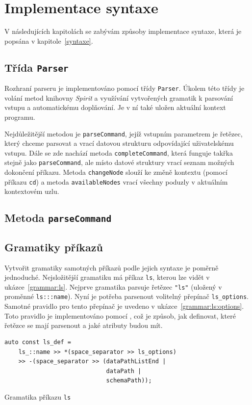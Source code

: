 \documentclass[thesis=B,czech,hidelinks]{FITthesis}[2019/03/06]
\begin{document}
\section{Implementace syntaxe}
V následujících kapitolách se zabývám způsoby implementace syntaxe, která je popsána v kapitole~\ref{syntaxe}.

\subsection{Třída \texttt{Parser}}
Rozhraní parseru je implementováno pomocí třídy \texttt{Parser}. Úkolem této třídy je volání metod knihovny \textit{Spirit} a využívání vytvořených gramatik k parsování vstupu a automatickému doplňování. Je v ní také uložen aktuální kontext programu.

Nejdůležitější metodou je \texttt{parseCommand}, jejíž vstupním parametrem je řetězec, který chceme parsovat a vrací datovou strukturu odpovídající uživatelskému vstupu. Dále se zde nachází metoda \texttt{completeCommand}, která funguje takřka stejně jako \texttt{parseCommand}, ale místo datové struktury vrací seznam možných dokončení příkazu. Metoda \texttt{changeNode} slouží ke změně kontextu (pomocí příkazu \texttt{cd}) a metoda \texttt{availableNodes} vrací všechny poduzly v aktuálním kontextovém uzlu.

\subsection{Metoda \texttt{parseCommand}}

\subsection{Gramatiky příkazů}
Vytvořit gramatiky samotných příkazů podle jejich syntaxe je poměrně jednoduché. Nejsložitější gramatiku má příkaz \texttt{ls}, kterou lze vidět v ukázce~\ref{grammar:ls}. Nejprve gramatika parsuje řetězec \verb¨"ls"¨ (uložený v proměnné \verb¨ls:::name¨). Nyní je potřeba parsenout volitelný přepínač \verb¨ls_options¨. Samotné pravidlo pro tento přepínač je uvedeno v ukázce~\ref{grammar:ls:options}. Toto pravidlo je implementováno pomocí , což je způsob, jak definovat, které řetězce se mají parsenout a jaké atributy budou mít.

\begin{listing}
\begin{verbatim}
auto const ls_def =
    ls_::name >> *(space_separator >> ls_options)
    >> -(space_separator >> (dataPathListEnd |
                             dataPath |
                             schemaPath));
\end{verbatim}
\caption{Gramatika příkazu \texttt{ls}}\label{grammar:ls}
\end{listing}
\end{document}
